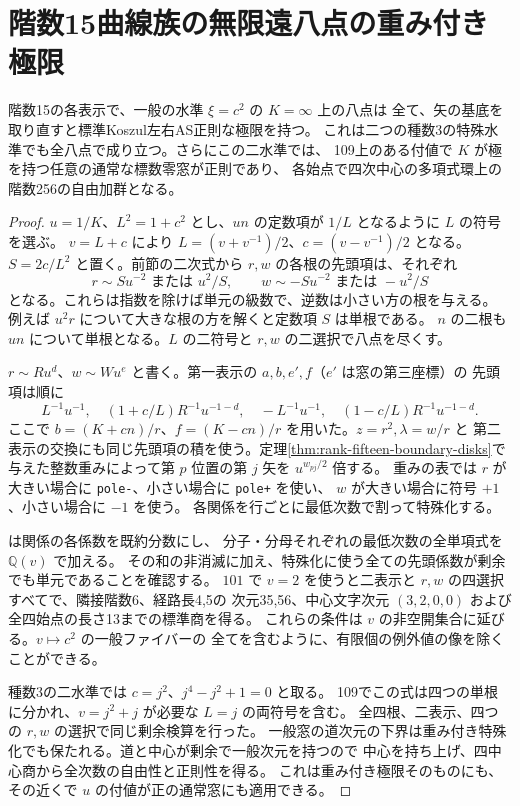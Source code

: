 \section{階数15曲線族の無限遠八点の重み付き極限}
\label{sec:rank-fifteen-pencil-infinity}
\begin{theorem}\label{thm:rank-fifteen-pencil-infinity}
階数15の各表示で、一般の水準 $\xi=c^2$ の $K=\infty$ 上の八点は
全て、矢の基底を取り直すと標準Koszul左右AS正則な極限を持つ。
これは二つの種数3の特殊水準でも全八点で成り立つ。さらにこの二水準では、
109上のある付値で $K$ が極を持つ任意の通常な標数零窓が正則であり、
各始点で四次中心の多項式環上の階数256の自由加群となる。
\end{theorem}
\begin{proof}
$u=1/K$、$L^2=1+c^2$ とし、$un$ の定数項が $1/L$ となるように $L$ の符号を選ぶ。
$v=L+c$ により $L=(v+v^{-1})/2$、$c=(v-v^{-1})/2$ となる。
$S=2c/L^2$ と置く。前節の二次式から
$r,w$ の各根の先頭項は、それぞれ
\[
 r\sim S u^{-2}\text{ または }u^2/S,\qquad
 w\sim -S u^{-2}\text{ または }-u^2/S
\]
となる。これらは指数を除けば単元の級数で、逆数は小さい方の根を与える。
例えば $u^2r$ について大きな根の方を解くと定数項 $S$ は単根である。
$n$ の二根も $un$ について単根となる。$L$ の二符号と $r,w$ の二選択で八点を尽くす。

$r\sim R u^d$、$w\sim W u^e$ と書く。第一表示の $a,b,e',f$（$e'$ は窓の第三座標）の
先頭項は順に
\[
 L^{-1}u^{-1},\quad (1+c/L)R^{-1}u^{-1-d},\quad
 -L^{-1}u^{-1},\quad(1-c/L)R^{-1}u^{-1-d}.
\]
ここで $b=(K+cn)/r$、$f=(K-cn)/r$ を用いた。$z=r^2,\lambda=w/r$ と
第二表示の交換にも同じ先頭項の積を使う。定理\ref{thm:rank-fifteen-boundary-disks}で
与えた整数重みによって第 $p$ 位置の第 $j$ 矢を $u^{w_{pj}/2}$ 倍する。
重みの表では $r$ が大きい場合に \texttt{pole-}、小さい場合に \texttt{pole+} を使い、
$w$ が大きい場合に符号 $+1$、小さい場合に $-1$ を使う。
各関係を行ごとに最低次数で割って特殊化する。

 は関係の各係数を既約分数にし、
分子・分母それぞれの最低次数の全単項式を $\mathbb Q(v)$ で加える。
その和の非消滅に加え、特殊化に使う全ての先頭係数が剰余でも単元であることを確認する。
$101$ で $v=2$ を使うと二表示と $r,w$ の四選択すべてで、隣接階数6、経路長4,5の
次元35,56、中心文字次元 $(3,2,0,0)$ および全四始点の長さ13までの標準商を得る。
これらの条件は $v$ の非空開集合に延びる。$v\mapsto c^2$ の一般ファイバーの
全てを含むように、有限個の例外値の像を除くことができる。

種数3の二水準では $c=j^2$、$j^4-j^2+1=0$ と取る。
109でこの式は四つの単根に分かれ、$v=j^2+j$ が必要な $L=j$ の両符号を含む。
全四根、二表示、四つの $r,w$ の選択で同じ剰余検算を行った。
一般窓の道次元の下界は重み付き特殊化でも保たれる。道と中心が剰余で一般次元を持つので
中心を持ち上げ、四中心商から全次数の自由性と正則性を得る。
これは重み付き極限そのものにも、その近くで $u$ の付値が正の通常窓にも適用できる。
\end{proof}
